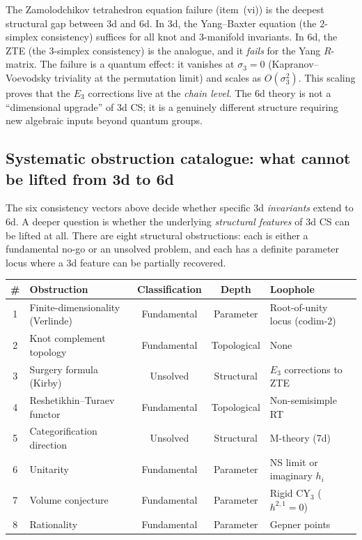 \begin{remark}
\label{rem:zte-6d-fingerprint}
The Zamolodchikov tetrahedron equation failure (item~(vi)) is the deepest structural gap between 3d and 6d. In 3d, the Yang--Baxter equation (the $2$-simplex consistency) suffices for all knot and $3$-manifold invariants. In 6d, the ZTE (the $3$-simplex consistency) is the analogue, and it \emph{fails} for the Yang $R$-matrix. The failure is a quantum effect: it vanishes at $\sigma_3 = 0$ (Kapranov--Voevodsky triviality at the permutation limit) and scales as $O(\sigma_3^2)$. This scaling proves that the $E_3$ corrections live at the \emph{chain level}. The 6d theory is not a ``dimensional upgrade'' of 3d CS; it is a genuinely different structure requiring new algebraic inputs beyond quantum groups.
\end{remark}


\subsection{Systematic obstruction catalogue: what cannot be lifted from 3d to 6d}
\label{subsec:3d-6d-obstruction-catalogue}

The six consistency vectors above decide whether specific 3d
\emph{invariants} extend to 6d.  A deeper question is whether the
underlying \emph{structural features} of 3d CS can be lifted at all.
There are eight structural obstructions: each is either a fundamental
no-go or an unsolved problem, and each has a definite parameter locus
where a 3d feature can be partially recovered.

\medskip

\begin{center}
\small
\renewcommand{\arraystretch}{1.3}
\begin{tabular}{clccl}
\toprule
\# & \textbf{Obstruction} & \textbf{Classification} & \textbf{Depth} & \textbf{Loophole} \\
\midrule
1 & Finite-dimensionality (Verlinde) & Fundamental & Parameter & Root-of-unity locus (codim-$2$) \\
2 & Knot complement topology & Fundamental & Topological & None \\
3 & Surgery formula (Kirby) & Unsolved & Structural & $E_3$ corrections to ZTE \\
4 & Reshetikhin--Turaev functor & Fundamental & Topological & Non-semisimple RT \\
5 & Categorification direction & Unsolved & Structural & M-theory (7d) \\
6 & Unitarity & Fundamental & Parameter & NS limit or imaginary $h_i$ \\
7 & Volume conjecture & Fundamental & Parameter & Rigid CY$_3$ ($h^{2,1} = 0$) \\
8 & Rationality & Fundamental & Parameter & Gepner points \\
\bottomrule
\end{tabular}
\end{center}

